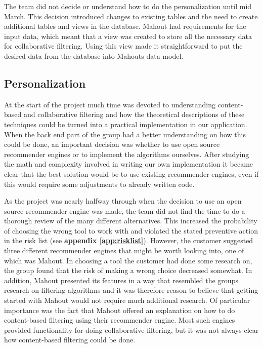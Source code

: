 The team did not decide or understand how to do the personalization until mid March. This decision introduced changes to existing tables and the need to create additional tables and views in the database. Mahout had requirements for the input data, which meant that a view was created to store all the necessary data for collaborative filtering. Using this view made it straightforward to put the desired data from the database into Mahouts data model.

\subsection{Personalization}

At the start of the project much time was devoted to understanding content-based and collaborative filtering and how the theoretical descriptions of these techniques could be turned into a practical implementation in our application. When the back end part of the group had a better understanding on how this could be done, an important decision was whether to use open source recommender engines or to implement the algorithms ourselves. After studying the math and complexity involved in writing our own implementation it became clear that the best solution would be to use existing recommender engines, even if this would require some adjustments to already written code. \newline

As the project was nearly halfway through when the decision to use an open source recommender engine was made, the team did not find the time to do a thorough review of the many different alternatives. This increased the probability of choosing the wrong tool to work with and violated the stated preventive action in the risk list (see \textbf{appendix \ref{app:risklist}}). However, the customer suggested three different recommender engines that might be worth looking into, one of which was Mahout. In choosing a tool the customer had done some research on, the group found that the risk of making a wrong choice decreased somewhat. In addition, Mahout presented its features in a way that resembled the groups research on filtering algorithms and it was therefore reason to believe that getting started with Mahout would not require much additional research. Of particular importance was the fact that Mahout offered an explanation on how to do content-based filtering using their recommender engine. Most such engines provided functionality for doing collaborative filtering, but it was not always clear how content-based filtering could be done.\newline

